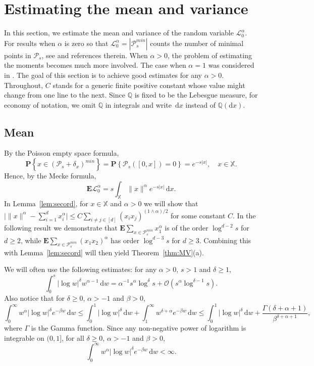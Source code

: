 \documentclass[11pt,reqno]{amsart}
\numberwithin{equation}{section}
\theoremstyle{definition}
\newcommand{\E}{\mathbf{E}}
\newcommand{\sP}{\mathcal{P}}
\newcommand{\Prob}[1]{\mathbf P\left\{#1\right\}}
\newcommand{\XX}{\mathbb{X}}
\newcommand{\QQ}{\mathbb{Q}}
\newcommand{\diff}{{\,\mathrm d}}
\newcommand{\ldiff}{{\mathrm d}}
\begin{document}
\section{Estimating the mean and variance}\label{sec:mv} In this section, we estimate the mean and variance of the random variable $\mathscr{L}_0^{\alpha}$.  
For results when $\alpha$ is zero so that $\mathscr{L}_0^{\alpha}=|\sP_{s}^{min}|$ counts the number of minimal points in $\sP_{s}$, see \cite{BDHT05} and references therein. When $\alpha>0$, the problem of estimating the moments becomes much more involved. The case when $\alpha=1$ was considered in \cite{BLP06}. The goal of this section is to achieve good estimates for any $\alpha>0$. Throughout, $C$ stands for a generic finite positive constant whose value might change from one line to the next. Since $\QQ$ is fixed to be the Lebesgue measure, for economy of notation, we omit $\QQ$ in integrals and write $\diff x$ instead of $\QQ(\ldiff x)$.

\subsection{Mean}
By the Poisson empty space formula, 
$$
\Prob{x \in (\sP_s + \delta_x)^{min}} =\Prob{\sP_s ( [0,x])=0}=e^{-s|x|}, \quad x \in \XX. 
$$
Hence, by the Mecke formula,
$$
\E \mathscr{L}_0^\alpha=s \int_\XX\|x\|^\alpha e^{-s|x|} \diff x.
$$
In Lemma~\ref{lem:secord}, for $x \in \XX$ and $\alpha >0$ we will show that $\big|\|x\|^\alpha - \sum_{i=1}^d x_i^\alpha \big| \le C \sum_{i \not = j \in [d]} (x_i x_j)^{(1 \wedge \alpha)/2}$ for some constant $C$.
In the following result we demonstrate that $\E \sum_{x \in \sP_s^{min}} x_1^\alpha$ is of the order $\log^{d-2} s$ for $d \ge 2$, while $\E \sum_{x \in \sP_s^{min}} (x_1x_2)^\alpha $ has order $\log^{d-3} s$ for $d \ge 3$. Combining this with Lemma~\ref{lem:secord} will then yield Theorem~\ref{thm:MV}(a).

We will often use the following estimates: for any $\alpha>0$, $s > 1$ and $\delta\ge 1$, 
\begin{equation}\label{eq:loges}
\int_0^s |\log w|^{\delta} w^{\alpha-1} \diff w=\alpha^{-1} s^{\alpha} \log^\delta s + \mathcal{O}(s^{\alpha} \log^{\delta-1} s).
\end{equation}
Also notice that for $\delta \ge 0$, $\alpha > -1$ and $\beta>0$,
$$
\int_{0}^\infty w^\alpha |\log w|^{\delta}  e^{-\beta w}\diff w \le \int_0^1 |\log w|^\delta \diff w + \int_1^\infty w^{\delta+\alpha} e^{-\beta w}\diff w \le  \int_0^1 |\log w|^\delta \diff w + \frac{\Gamma (\delta+\alpha+1)}{\beta^{\delta+\alpha+1}},
$$
where $\Gamma$ is the Gamma function. Since any non-negative power of logarithm is integrable on $(0,1]$,
for all $\delta \ge 0$, $\alpha > -1$ and $\beta>0$,
\begin{equation}
	\label{eq:Gamma}
	\int_{0}^\infty w^{\alpha} |\log w|^{\delta} e^{-\beta w}\diff w <\infty. 
\end{equation} 
\end{document}
